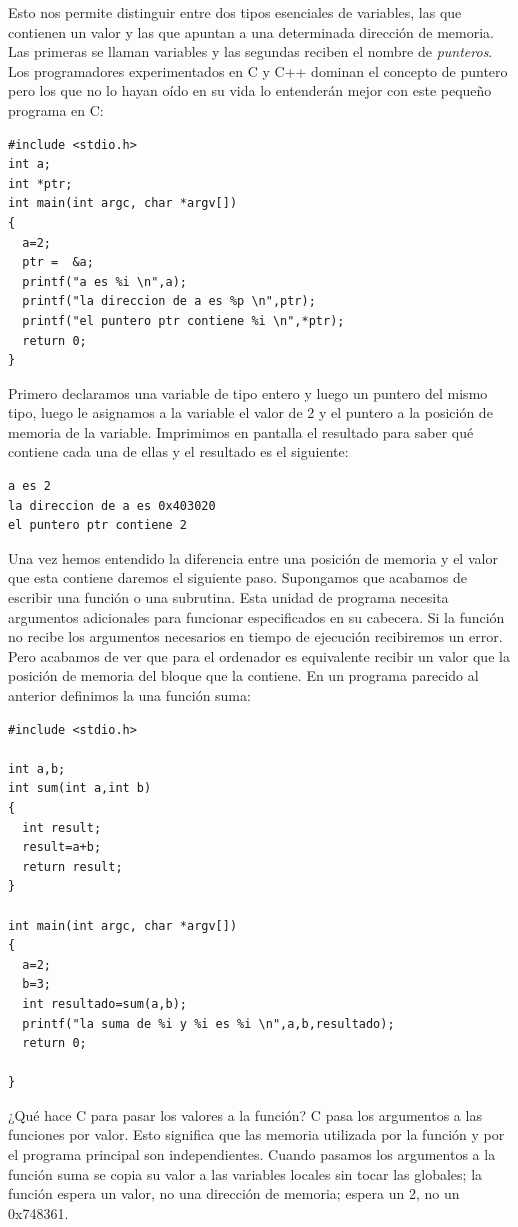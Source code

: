 Esto nos permite distinguir entre dos tipos esenciales de variables,
las que contienen un valor y las que apuntan a una determinada
dirección de memoria. Las primeras se llaman variables y las segundas
reciben el nombre de \emph{punteros}. Los programadores experimentados
en C y C++ dominan el concepto de puntero pero los que no lo hayan
oído en su vida lo entenderán mejor con este pequeño programa en C:

\begin{verbatim}
#include <stdio.h>
int a;
int *ptr;
int main(int argc, char *argv[])
{
  a=2;
  ptr =  &a;
  printf("a es %i \n",a);
  printf("la direccion de a es %p \n",ptr);
  printf("el puntero ptr contiene %i \n",*ptr);
  return 0;
}
\end{verbatim}

Primero declaramos una variable de tipo entero y luego un puntero del
mismo tipo, luego le asignamos a la variable el valor de 2 y el
puntero a la posición de memoria de la variable. Imprimimos en
pantalla el resultado para saber qué contiene cada una de ellas y el
resultado es el siguiente:

\begin{verbatim}
a es 2
la direccion de a es 0x403020
el puntero ptr contiene 2
\end{verbatim}

Una vez hemos entendido la diferencia entre una posición de memoria y
el valor que esta contiene daremos el siguiente paso. Supongamos que
acabamos de escribir una función o una subrutina. Esta unidad de
programa necesita argumentos adicionales para funcionar especificados
en su cabecera. Si la función no recibe los argumentos necesarios en
tiempo de ejecución recibiremos un error. Pero acabamos de ver que
para el ordenador es equivalente recibir un valor que la posición de
memoria del bloque que la contiene. En un programa parecido al
anterior definimos la una función suma:

\begin{verbatim}
#include <stdio.h>

int a,b;
int sum(int a,int b)
{ 
  int result;
  result=a+b;
  return result;
}

int main(int argc, char *argv[])
{
  a=2;
  b=3;
  int resultado=sum(a,b);
  printf("la suma de %i y %i es %i \n",a,b,resultado);
  return 0;

}
\end{verbatim}

¿Qué hace C para pasar los valores a la función? C pasa los argumentos
a las funciones por valor. Esto significa que las memoria utilizada
por la función y por el programa principal son independientes. Cuando
pasamos los argumentos a la función suma se copia su valor a las
variables locales sin tocar las globales; la función espera un valor,
no una dirección de memoria; espera un 2, no un 0x748361.

